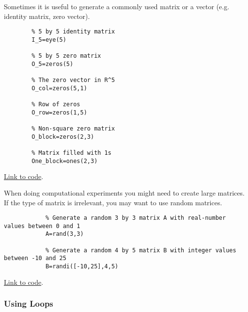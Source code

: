 \documentclass{ximera}
\begin{document}
    \begin{template}\label{temp:id_matrix}
    Sometimes it is useful to generate a commonly used matrix or a vector (e.g. identity matrix, zero vector). 
    
    \begin{verbatim}
        % 5 by 5 identity matrix
        I_5=eye(5)
        
        % 5 by 5 zero matrix
        O_5=zeros(5)
        
        % The zero vector in R^5
        O_col=zeros(5,1)
        
        % Row of zeros
        O_row=zeros(1,5)
        
        % Non-square zero matrix
        O_block=zeros(2,3)
        
        % Matrix filled with 1s
        One_block=ones(2,3)
    \end{verbatim}
    
    \href{https://sagecell.sagemath.org/?z=eJxdzT0OwjAMBeA9Uu7gpRJIYSgoIwdgAKSKGdQfV40IsUgDoZyepk06sHiwv_ecgYRqGIdq0DjlBniUzqoPZ4eb3OOAK7nmjLMsuS9aWsx5NGHRL-rS4UzeWDuyoAwUVxlkTTpZkUddkAdqp0AfjCUfTS5S44nMpn--Sov_vytN9T36rdhFf5zu0CqtsQGvXAd5KDcYA2Rw9j9PMkr_&lang=octave&interacts=eJyLjgUAARUAuQ==}{Link to code}.
    \end{template}
    
    \begin{template}\label{temp:randMat}
        When doing computational experiments you might need to create large matrices.  If the type of matrix is irrelevant, you may want to use random matrices.
    
        \begin{verbatim}
            % Generate a random 3 by 3 matrix A with real-number values between 0 and 1
            A=rand(3,3)
            
            % Generate a random 4 by 5 matrix B with integer values between -10 and 25
            B=randi([-10,25],4,5)
        \end{verbatim}
    
    \href{https://sagecell.sagemath.org/?z=eJxtzLEKwjAUheE9kHc4S6GFFGzTjA7t0ocQhxu8aKCJEFNb397U4qTLGX44X4GRA0dKDEKkcLl7aNhXHk8puhU9FpduiExTHWZvOeJJ08wPWE4Lc8AB-YdGiv64CaVWupJCiuKP3W22-drDbruQ-Prr1s0ut0aK4UO78pSjas1ZdcpUb3XOOqE=&lang=octave&interacts=eJyLjgUAARUAuQ==}{Link to code}.    
    \end{template}

    \subsubsection*{Using Loops}
\end{document}

